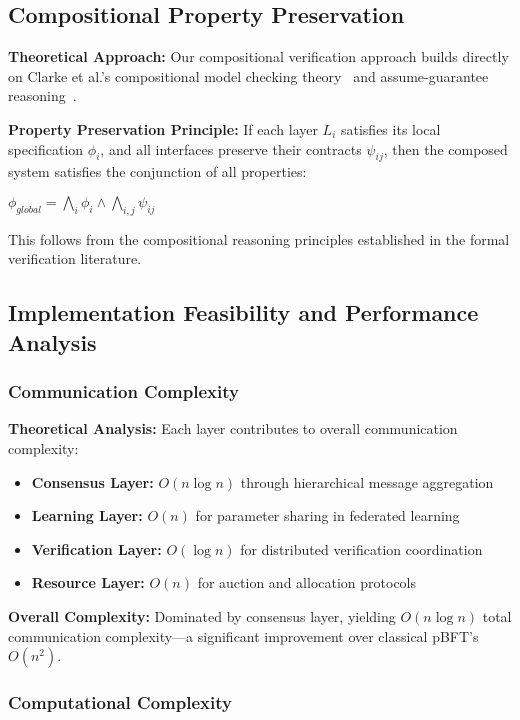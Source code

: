 \documentclass[conference]{IEEEtran}
\begin{document}
\subsection{Compositional Property Preservation}

\textbf{Theoretical Approach:} Our compositional verification approach builds directly on Clarke et al.'s compositional model checking theory~\cite{clarke1989compositional} and assume-guarantee reasoning~\cite{jones1983tentative}.

\textbf{Property Preservation Principle:} If each layer $L_i$ satisfies its local specification $\phi_i$, and all interfaces preserve their contracts $\psi_{ij}$, then the composed system satisfies the conjunction of all properties:

$\phi_{global} = \bigwedge_i \phi_i \land \bigwedge_{i,j} \psi_{ij}$

This follows from the compositional reasoning principles established in the formal verification literature.

\subsection{Implementation Feasibility and Performance Analysis}

\subsubsection{Communication Complexity}

\textbf{Theoretical Analysis:} Each layer contributes to overall communication complexity:
\begin{itemize}
    \item \textbf{Consensus Layer:} $O(n \log n)$ through hierarchical message aggregation
    \item \textbf{Learning Layer:} $O(n)$ for parameter sharing in federated learning
    \item \textbf{Verification Layer:} $O(\log n)$ for distributed verification coordination
    \item \textbf{Resource Layer:} $O(n)$ for auction and allocation protocols
\end{itemize}

\textbf{Overall Complexity:} Dominated by consensus layer, yielding $O(n \log n)$ total communication complexity—a significant improvement over classical pBFT's $O(n^2)$.

\subsubsection{Computational Complexity}
\end{document}
